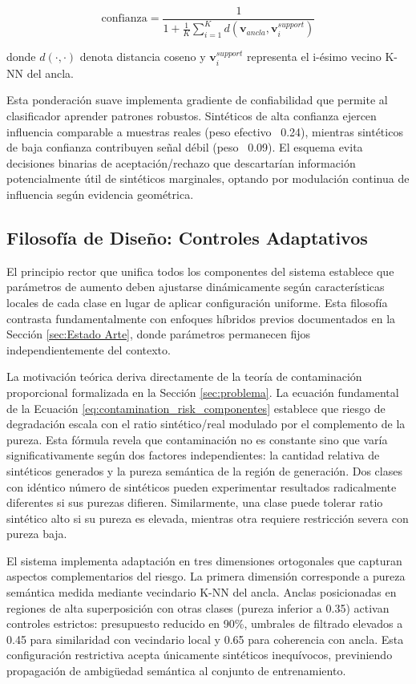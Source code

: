 \begin{equation}
\text{confianza} = \frac{1}{1 + \frac{1}{K}\sum_{i=1}^{K} d(\mathbf{v}_{ancla}, \mathbf{v}_i^{support})}
\label{eq:confianza_geometrica}
\end{equation}

donde $d(\cdot, \cdot)$ denota distancia coseno y $\mathbf{v}_i^{support}$ representa el i-ésimo vecino K-NN del ancla.

Esta ponderación suave implementa gradiente de confiabilidad que permite al clasificador aprender patrones robustos. Sintéticos de alta confianza ejercen influencia comparable a muestras reales (peso efectivo ~0.24), mientras sintéticos de baja confianza contribuyen señal débil (peso ~0.09). El esquema evita decisiones binarias de aceptación/rechazo que descartarían información potencialmente útil de sintéticos marginales, optando por modulación continua de influencia según evidencia geométrica.

\subsection{Filosofía de Diseño: Controles Adaptativos}
\label{subsec:filosofia_diseno}

El principio rector que unifica todos los componentes del sistema establece que parámetros de aumento deben ajustarse dinámicamente según características locales de cada clase en lugar de aplicar configuración uniforme. Esta filosofía contrasta fundamentalmente con enfoques híbridos previos documentados en la Sección \ref{sec:Estado Arte}, donde parámetros permanecen fijos independientemente del contexto.

La motivación teórica deriva directamente de la teoría de contaminación proporcional formalizada en la Sección \ref{sec:problema}. La ecuación fundamental de la Ecuación \ref{eq:contamination_risk_componentes} establece que riesgo de degradación escala con el ratio sintético/real modulado por el complemento de la pureza. Esta fórmula revela que contaminación no es constante sino que varía significativamente según dos factores independientes: la cantidad relativa de sintéticos generados y la pureza semántica de la región de generación. Dos clases con idéntico número de sintéticos pueden experimentar resultados radicalmente diferentes si sus purezas difieren. Similarmente, una clase puede tolerar ratio sintético alto si su pureza es elevada, mientras otra requiere restricción severa con pureza baja.

El sistema implementa adaptación en tres dimensiones ortogonales que capturan aspectos complementarios del riesgo. La primera dimensión corresponde a pureza semántica medida mediante vecindario K-NN del ancla. Anclas posicionadas en regiones de alta superposición con otras clases (pureza inferior a 0.35) activan controles estrictos: presupuesto reducido en 90\%, umbrales de filtrado elevados a 0.45 para similaridad con vecindario local y 0.65 para coherencia con ancla. Esta configuración restrictiva acepta únicamente sintéticos inequívocos, previniendo propagación de ambigüedad semántica al conjunto de entrenamiento.

